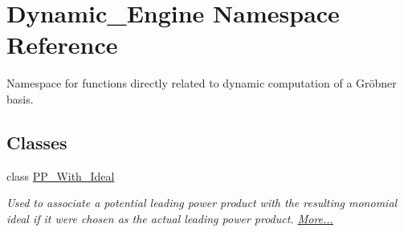 \hypertarget{namespace_dynamic___engine}{}\section{Dynamic\+\_\+\+Engine Namespace Reference}
\label{namespace_dynamic___engine}


Namespace for functions directly related to dynamic computation of a Gr\"{o}bner basis.  


\subsection*{Classes}
\begin{DoxyCompactItemize}
\item 
class \hyperlink{group___g_b_computation_class_dynamic___engine_1_1_p_p___with___ideal}{P\+P\+\_\+\+With\+\_\+\+Ideal}
\begin{DoxyCompactList}\small\item\em Used to associate a potential leading power product with the resulting monomial ideal if it were chosen as the actual leading power product.  \hyperlink{group___g_b_computation_class_dynamic___engine_1_1_p_p___with___ideal}{More...}\end{DoxyCompactList}\end{DoxyCompactItemize}
